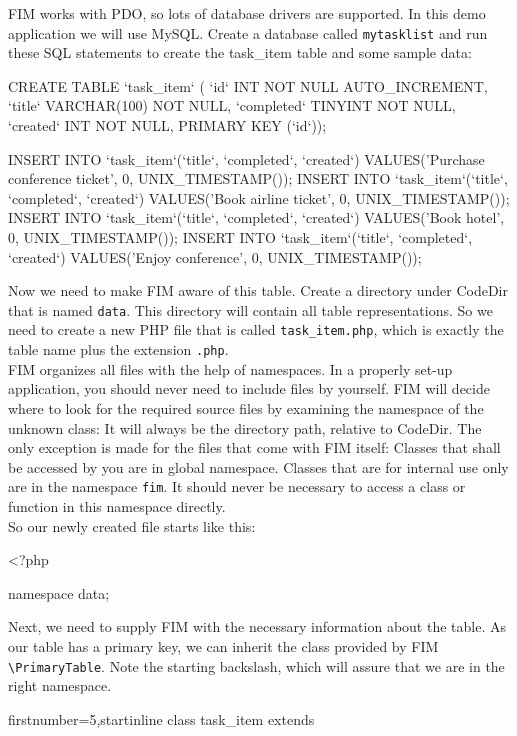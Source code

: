 \documentclass{scrartcl}
\begin{document}
      FIM works with PDO, so lots of database drivers are supported. In this demo application we will use MySQL. Create a database called \texttt{mytasklist} and run these SQL statements to create the task\_item table and some sample data:
      \begin{mysqlcode}
CREATE TABLE `task_item` (
  `id` INT NOT NULL AUTO_INCREMENT,
  `title` VARCHAR(100) NOT NULL,
  `completed` TINYINT NOT NULL,
  `created` INT NOT NULL,
  PRIMARY KEY (`id`));

INSERT INTO `task_item`(`title`, `completed`, `created`)
  VALUES('Purchase conference ticket', 0, UNIX_TIMESTAMP());
INSERT INTO `task_item`(`title`, `completed`, `created`)
  VALUES('Book airline ticket', 0, UNIX_TIMESTAMP());
INSERT INTO `task_item`(`title`, `completed`, `created`)
  VALUES('Book hotel', 0, UNIX_TIMESTAMP());
INSERT INTO `task_item`(`title`, `completed`, `created`)
  VALUES('Enjoy conference', 0, UNIX_TIMESTAMP());
      \end{mysqlcode}
      Now we need to make FIM aware of this table. Create a directory under CodeDir that is named \texttt{data}. This directory will contain all table representations. So we need to create a new PHP file that is called \texttt{task\_item.php}, which is exactly the table name plus the extension \texttt{.php}. \\
      FIM organizes all files with the help of namespaces. In a properly set-up application, you should never need to include files by yourself. FIM will decide where to look for the required source files by examining the namespace of the unknown class: It will always be the directory path, relative to CodeDir. The only exception is made for the files that come with FIM itself: Classes that shall be accessed by you are in global namespace. Classes that are for internal use only are in the namespace \texttt{fim}. It should never be necessary to access a class or function in this namespace directly. \\
      So our newly created file starts like this:
      \begin{phpcode}
<?php

namespace data;
      \end{phpcode}
      Next, we need to supply FIM with the necessary information about the table. As our table has a primary key, we can inherit the class provided by FIM \texttt{\textbackslash PrimaryTable}. Note the starting backslash, which will assure that we are in the right namespace.
      \begin{phpcode*}{firstnumber=5,startinline}
class task_item extends \PrimaryTable {

}
      \end{phpcode*}
\end{document}
